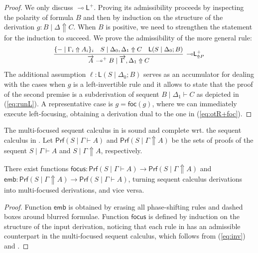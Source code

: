 \documentclass[runningheads]{llncs}
\renewcommand{\vec}{\overrightarrow}
\newcommand{\lleft}{{\multimap}\mathsf{L}}
\newcommand{\lolliL}{\lleft}
\newcommand{\lolli}{\multimap}
\renewcommand{\L}{\mathsf{L}}
\newcommand{\up}{\Uparrow}
\newcommand{\foc}{\mathsf{foc}}
\newcommand{\focus}{\mathsf{focus}}
\newcommand{\emb}{\mathsf{emb}}
\newcommand{\Prf}{\mathsf{Prf}}
\begin{document}
\begin{proof}
  We only discuss $\lolliL^+$. Proving its admissibility proceeds by inspecting the polarity of formula $B$ and then by induction on the structure of the derivation $g : B \mid \Delta \up C$. When $B$ is positive, we need to strengthen the statement for the induction to succeed. We prove the admissibility of the more general rule:
  \[
  \small
  \begin{array}{c}
    \infer[\lolliL^+_{\up P}]{\vec{A} \lolli^+ B \mid \vec{\Gamma} , \Delta_1 \up C}{
      \{ - \mid \Gamma_i \up A_i \}_{i}
      &
      S \mid \Delta_0,\Delta_1 \up C
      &
      \L(S\mid \Delta_0;B)
    }
  \end{array}
  \]
  The additional assumption $\ell:\L(S\mid \Delta_0;B)$ serves as an accumulator for dealing with the cases when $g$ is a left-invertible rule
  and it allows to state that the proof of the second premise is a subderivation of sequent $B \mid \Delta_1 \vdash C$ as depicted in (\ref{eq:runL}). A representative case is $g = \foc(g)$, where we can immediately execute left-focusing, obtaining a derivation dual to the one in (\ref{eq:otR+foc}).
\end{proof}

The multi-focused sequent calculus in  is sound and complete wrt. the sequent calculus in . 
Let $\Prf(S \mid \Gamma \vdash A)$ and $\Prf(S \mid \Gamma \up A)$ be the sets of proofs of the sequent $S \mid \Gamma \vdash A$ and $S \mid \Gamma \up A$, respectively.
\begin{theorem}\label{thm}
  There exist functions $\focus : \Prf(S \mid \Gamma \vdash A) \to \Prf(S \mid \Gamma \up A)$  and $\emb: \Prf(S \mid \Gamma \up A) \to \Prf(S \mid \Gamma \vdash A)$, turning sequent calculus derivations into multi-focused derivations, and vice versa.
\end{theorem}
\begin{proof}
Function $\emb$ is obtained by erasing all phase-shifting rules and dashed boxes around blurred formulae. Function $\focus$ is defined by induction on the structure of the input derivation, noticing that each rule in  has an admissible counterpart in the multi-focused sequent calculus, which follows from (\ref{eq:inv}) and .
\end{proof}
\end{document}
